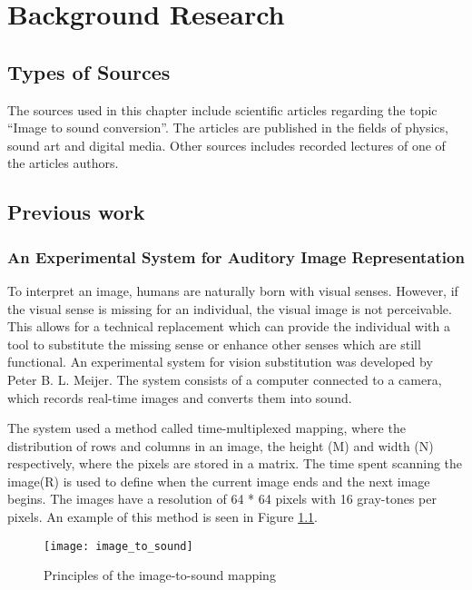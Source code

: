 \chapter{Background Research}\label{ch:bgresearch}

\section{Types of Sources}\label{sec:typesofsources} 
The sources used in this chapter include scientific articles regarding the topic “Image to sound conversion”. The articles are published in the fields of physics, sound art and digital media.  Other sources includes recorded lectures of one of the articles authors.

\section{Previous work}\label{sec:previouswork}

\subsection{An Experimental System for Auditory Image Representation}\label{sec:experimentalsystem}

To interpret an image, humans are naturally born with visual senses. However, if the visual sense is missing for an individual, the visual image is not perceivable. This allows for a technical replacement which can provide the individual with a tool to substitute the missing sense or enhance other senses which are still functional. An experimental system for vision substitution was developed by Peter B. L. Meijer\cite{Meijer1992}. The system consists of a computer connected to a camera, which records real-time images and converts them into sound. 

The system used a method called time-multiplexed mapping, where the distribution of rows and columns in an image, the height (M) and width (N) respectively, where the pixels are stored in a matrix. The time spent scanning the image(R) is used to define when the current image ends and the next image begins. The images have a resolution of 64 * 64 pixels with 16 gray-tones per pixels. An example of this method is seen in Figure  \ref{fig:image_to_sound}. 

\begin{figure}[!h] 
\centering
\texttt{[image: image\_to\_sound]}
\caption{\label{fig:image_to_sound} Principles of the image-to-sound mapping \cite{Meijer1992}}
\end{figure}
  
